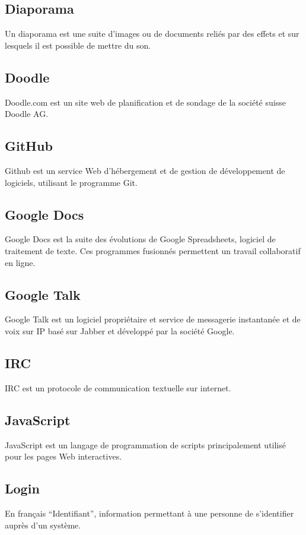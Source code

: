 \documentclass{life-fr}
\begin{document}
\subsection{ Diaporama}
Un diaporama est une suite d’images ou de documents reliés par des effets et sur lesquels il est possible de mettre du son.

\subsection{ Doodle}
Doodle.com est un site web de planification et de sondage de la société suisse Doodle AG.

\subsection{ GitHub}
Github est un service Web d'hébergement et de gestion de développement de logiciels, utilisant le programme Git. 

\subsection{ Google Docs}
Google Docs est la suite des évolutions de Google Spreadsheets, logiciel de traitement de texte. Ces programmes fusionnés permettent un travail collaboratif en ligne.

\subsection{ Google Talk}
Google Talk est un logiciel propriétaire et service de messagerie instantanée et de voix sur IP basé sur Jabber et développé par la société Google.

\subsection{ IRC}
IRC est un protocole de communication textuelle sur internet.

\subsection{ JavaScript}
JavaScript est un langage de programmation de scripts principalement utilisé pour les pages Web interactives.

\subsection{ Login}
En français ``Identifiant'', information permettant à une personne de s'identifier auprès d'un système.
\end{document}
